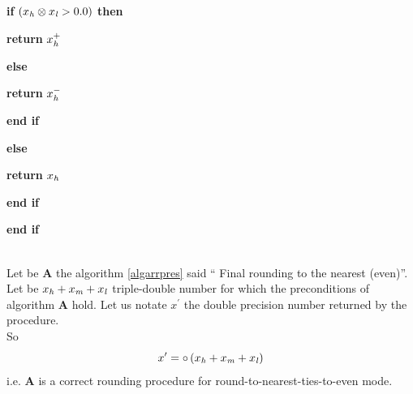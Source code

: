 \begin{algorithm}
\begin{center}
\begin{minipage}[b]{80mm}
\begin{center}
\begin{minipage}[b]{70mm}
\vspace{-2.4mm}
\begin{center}
\begin{minipage}[b]{60mm}
{\bf if} $\left( x_{\mathit{h}} \otimes x_{\mathit{l}} > 0.0 \right)$ {\bf then} 
\vspace{-2.4mm}
\begin{center}
\begin{minipage}[b]{50mm}
\vspace{-2.4mm}
{\bf return } $x_{\mathit{h}}^+ $
\end{minipage}
\end{center}
\vspace{-2.4mm}
{\bf else}
\vspace{-2.4mm}
\begin{center}
\begin{minipage}[b]{50mm}
\vspace{-2.4mm}
{\bf return } $x_{\mathit{h}}^- $
\end{minipage}
\end{center}
\vspace{-2.4mm}
{\bf end if} 
\end{minipage}
\end{center}
\vspace{-2.4mm}
{\bf else}
\vspace{-2.4mm}
\begin{center}
\begin{minipage}[b]{60mm}
\vspace{-2.4mm}
{\bf return } $x_{\mathit{h}} $
\end{minipage}
\end{center}
\vspace{-2.4mm}
{\bf end if} 
\end{minipage}
\end{center}
\vspace{-2.4mm}
{\bf end if} 
\end{minipage}
\end{center}
\end{algorithm}

\begin{theorem}\label{corralgpluspres} ~\\
Let be {\bf A} the algorithm \ref{algarrpres} said `` Final rounding to the nearest (even)''.
Let be $x_{\mathit{h}} + x_{\mathit{m}} + x_{\mathit{l}}$ triple-double number for which the preconditions of algorithm {\bf A} hold.
Let us notate $x^\prime$ the double precision number returned by the procedure. \\
So
$$x^\prime = \circ \left( x_{\mathit{h}} + x_{\mathit{m}} + x_{\mathit{l}} \right)$$
i.e. {\bf A} is a correct rounding procedure for round-to-nearest-ties-to-even mode.
\end{theorem}

